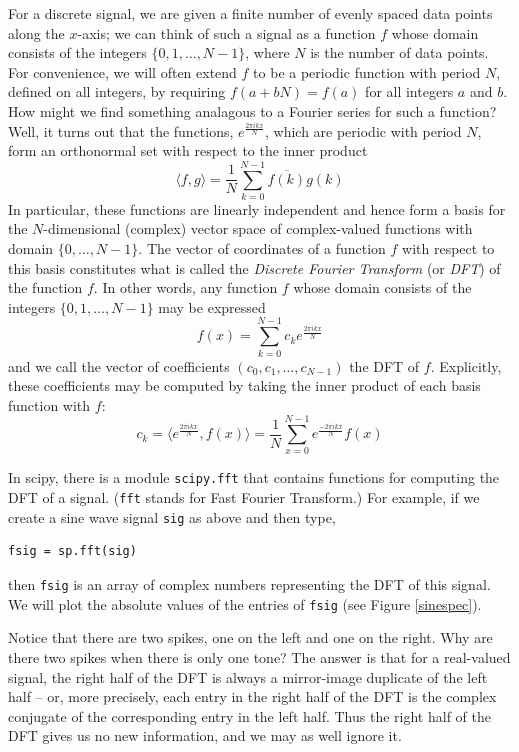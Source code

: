 For a discrete signal, we are given a finite number of evenly spaced data points along the $x$-axis; we can think of such a signal as a function $f$ whose domain consists of the integers $\{0,1,\dots,N-1\}$, where $N$ is the number of data points. 
For convenience, we will often extend $f$ to be a periodic function with period $N$, defined on all integers, by requiring $f(a+bN)=f(a)$ for all integers $a$ and $b$. 
How might we find something analagous to a Fourier series for such a function? 
Well, it turns out that the functions, $e^{\frac{2\pi ikx}N}$, which are periodic with period $N$, form an orthonormal set with respect to the inner product
$$\langle f,g\rangle = \frac1N\sum_{k=0}^{N-1}\overline{f(k)}g(k)$$
In particular, these functions are linearly independent and hence form a basis for the $N$-dimensional (complex) vector space of complex-valued functions with domain $\{0,\dots,N-1\}$. The vector of coordinates of a function $f$ with respect to this basis constitutes what is called the \emph{Discrete Fourier Transform} (or \emph{DFT}) of the function $f$. In other words, any function $f$ whose domain consists of the integers $\{0,1,\dots,N-1\}$ may be expressed
$$f(x)=\sum_{k=0}^{N-1}c_ke^{\frac{2\pi ikx}N}$$
and we call the vector of coefficients $(c_0,c_1,\dots,c_{N-1})$ the DFT of $f$. Explicitly, these coefficients may be computed by taking the inner product of each basis function with $f$:
$$c_k=\langle e^{\frac{2\pi ikx}N}, f(x)\rangle=\frac1N\sum_{x=0}^{N-1}e^{\frac{-2\pi ikx}N}f(x)$$

In scipy, there is a module \texttt{scipy.fft} that contains functions for computing the DFT of a signal. (\texttt{fft} stands for Fast Fourier Transform.) For example, if we create a sine wave signal \texttt{sig} as above and then type,
\begin{lstlisting}
fsig = sp.fft(sig)
\end{lstlisting}
then \texttt{fsig} is an array of complex numbers representing the DFT of this signal. We will plot the absolute values of the entries of \texttt{fsig} (see Figure \ref{sinespec}).

Notice that there are two spikes, one on the left and one on the right. Why are there two spikes when there is only one tone? The answer is that for a real-valued signal, the right half of the DFT is always a mirror-image duplicate of the left half -- or, more precisely, each entry in the right half of the DFT is the complex conjugate of the corresponding entry in the left half. Thus the right half of the DFT gives us no new information, and we may as well ignore it.

